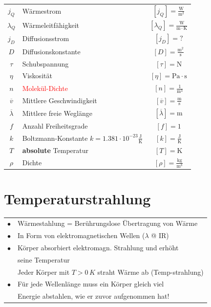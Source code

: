 \begin{tabular}{c l c}
	\rule{0pt}{10pt}$j_Q$ & Wärmestrom & $[j_Q] = \mathrm{\frac{W}{m^2}}$ \\
	\rule{0pt}{10pt}$\lambda_Q$ & Wärmeleitfähigkeit & $[\lambda_Q] = \mathrm{\frac{W}{m \cdot K}}$ \\
	$j_D$ & Diffusionsstrom & $[j_D] = ?$ \\
	\rule{0pt}{10pt}$D$ & Diffusionskonstante & $[D] = \mathrm{\frac{m^2}{s}}$ \\
	$\tau$ & Schubspannung & $[\tau] = \mathrm{N}$ \\
	$\eta$ & Viskosität & $[\eta] = \mathrm{Pa \cdot s}$ \\
	\rule{0pt}{10pt}$n$ & \textcolor{red}{Molekül-Dichte} & $[n] = \mathrm{\frac{1}{m^3}}$\\	
	\rule{0pt}{10pt}$\overline{v}$ & Mittlere Geschwindigkeit & $[\overline{v}] = \mathrm{\frac{m}{s}}$ \\
	\rule{0pt}{10pt}$\overline{\lambda}$ & Mittlere freie Weglänge & $[\overline{\lambda}] = \mathrm{m}$ \\
	$f$ & Anzahl Freiheitsgrade & $[f] = \mathrm{1}$ \\
	\rule{0pt}{10pt}$k$ & Boltzmann-Konstante $k = 1.381 \cdot 10^{-23} \mathrm{\frac{J}{K}}$ & $[k] = \mathrm{\frac{J}{K}}$ \\
	$T$ & \textbf{absolute} Temperatur & $[T] = \mathrm{K}$ \\
	\rule{0pt}{10pt}$\rho$ & Dichte & $[\rho] = \mathrm{\frac{kg}{m^3}}$ \\
\end{tabular}


\section{Temperaturstrahlung}

\begin{tabular}{ll}
$\bullet$ & Wärmestahlung = Berührungslose Übertragung von Wärme \\
$\bullet$ & In Form von elektromagnetischen Wellen ($\lambda$ @ IR) \\
$\bullet$ & Körper absorbiert elektromagn. Strahlung und erhöht \\
		  & seine Temperatur \\ 
          & Jeder Körper mit $T > 0 \, K$ straht Wärme ab (Temp-strahlung) \\
$\bullet$ & Für jede Wellenlänge muss ein Körper gleich viel  \\
		  & Energie abstahlen, wie er zuvor aufgenommen hat!\\
\end{tabular}




